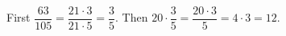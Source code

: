 First $\dfrac{63}{105}=\dfrac{21\cdot3}{21\cdot5}=\dfrac35$. Then $20\cdot\dfrac35=\dfrac{20\cdot3}{5}=4\cdot3=\boxed{12}$.
